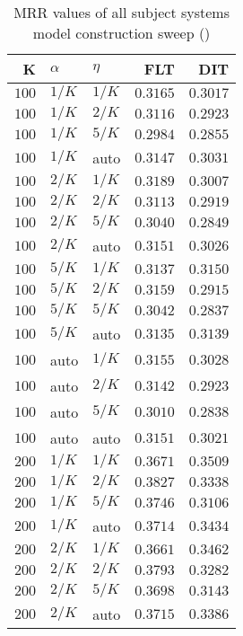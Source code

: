 
\begin{table}
\begin{spacing}{1.2}
\centering
\caption{MRR values of all subject systems model construction sweep (\cone)}
\label{table:all_model_sweep}
\vspace{0.2em}
\parbox{.45\linewidth}{\centering \begin{tabular}{rll|rr}
\toprule
    K &  $\alpha$ &    $\eta$ &      FLT &      DIT \\
\midrule
$100$ &  $1/K$ &  $1/K$ & $0.3165$ & $0.3017$ \\
$100$ &  $1/K$ &  $2/K$ & $0.3116$ & $0.2923$ \\
$100$ &  $1/K$ &  $5/K$ & $0.2984$ & $0.2855$ \\
$100$ &  $1/K$ &   auto & $0.3147$ & $0.3031$ \\
$100$ &  $2/K$ &  $1/K$ & $0.3189$ & $0.3007$ \\
$100$ &  $2/K$ &  $2/K$ & $0.3113$ & $0.2919$ \\
$100$ &  $2/K$ &  $5/K$ & $0.3040$ & $0.2849$ \\
$100$ &  $2/K$ &   auto & $0.3151$ & $0.3026$ \\
$100$ &  $5/K$ &  $1/K$ & $0.3137$ & $0.3150$ \\
$100$ &  $5/K$ &  $2/K$ & $0.3159$ & $0.2915$ \\
$100$ &  $5/K$ &  $5/K$ & $0.3042$ & $0.2837$ \\
$100$ &  $5/K$ &   auto & $0.3135$ & $0.3139$ \\
$100$ &   auto &  $1/K$ & $0.3155$ & $0.3028$ \\
$100$ &   auto &  $2/K$ & $0.3142$ & $0.2923$ \\
$100$ &   auto &  $5/K$ & $0.3010$ & $0.2838$ \\
$100$ &   auto &   auto & $0.3151$ & $0.3021$ \\
$200$ &  $1/K$ &  $1/K$ & $0.3671$ & $0.3509$ \\
$200$ &  $1/K$ &  $2/K$ & $0.3827$ & $0.3338$ \\
$200$ &  $1/K$ &  $5/K$ & $0.3746$ & $0.3106$ \\
$200$ &  $1/K$ &   auto & $0.3714$ & $0.3434$ \\
$200$ &  $2/K$ &  $1/K$ & $0.3661$ & $0.3462$ \\
$200$ &  $2/K$ &  $2/K$ & $0.3793$ & $0.3282$ \\
$200$ &  $2/K$ &  $5/K$ & $0.3698$ & $0.3143$ \\
$200$ &  $2/K$ &   auto & $0.3715$ & $0.3386$ \\

\end{tabular}}
\end{spacing}
\end{table}
